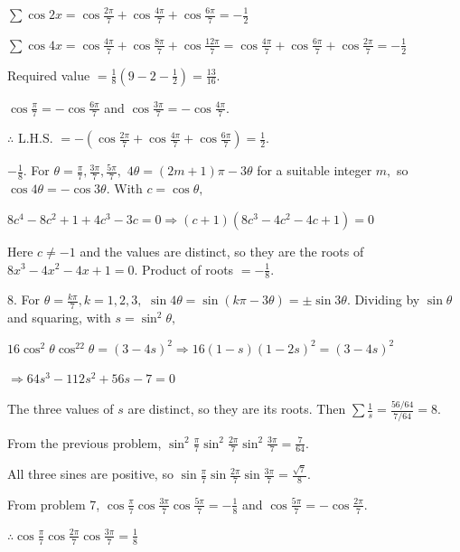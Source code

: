   $\sum\cos2x = \cos\frac{2\pi}{7} + \cos\frac{4\pi}{7} + \cos\frac{6\pi}{7} = -\frac{1}{2}$

  $\sum\cos4x = \cos\frac{4\pi}{7} + \cos\frac{8\pi}{7} + \cos\frac{12\pi}{7} = \cos\frac{4\pi}{7} + \cos\frac{6\pi}{7} +
  \cos\frac{2\pi}{7} = -\frac{1}{2}$

  Required value $= \frac{1}{8}\left(9 - 2 - \frac{1}{2}\right) = \frac{13}{16}$.

\item $\cos\frac{\pi}{7} = -\cos\frac{6\pi}{7}$ and $\cos\frac{3\pi}{7} = -\cos\frac{4\pi}{7}$.

  $\therefore$ L.H.S. $= -\left(\cos\frac{2\pi}{7} + \cos\frac{4\pi}{7} + \cos\frac{6\pi}{7}\right) = \frac{1}{2}$.

\item $-\frac{1}{8}$. For $\theta = \frac{\pi}{7}, \frac{3\pi}{7}, \frac{5\pi}{7},$ $4\theta = (2m + 1)\pi - 3\theta$ for a
  suitable integer $m,$ so $\cos4\theta = -\cos3\theta$. With $c = \cos\theta,$

  $8c^4 - 8c^2 + 1 + 4c^3 - 3c = 0 \Rightarrow (c + 1)(8c^3 - 4c^2 - 4c + 1) = 0$

  Here $c \neq -1$ and the values are distinct, so they are the roots of $8x^3 - 4x^2 - 4x + 1 = 0$. Product of roots $=
  -\frac{1}{8}$.

\item $8$. For $\theta = \frac{k\pi}{7}, k = 1, 2, 3,$ $\sin4\theta = \sin(k\pi - 3\theta) = \pm\sin3\theta$. Dividing by
  $\sin\theta$ and squaring, with $s = \sin^2\theta,$

  $16\cos^2\theta\cos^22\theta = (3 - 4s)^2 \Rightarrow 16(1 - s)(1 - 2s)^2 = (3 - 4s)^2$

  $\Rightarrow 64s^3 - 112s^2 + 56s - 7 = 0$

  The three values of $s$ are distinct, so they are its roots. Then $\sum\frac{1}{s} = \frac{56/64}{7/64} = 8$.

\item From the previous problem, $\sin^2\frac{\pi}{7}\sin^2\frac{2\pi}{7}\sin^2\frac{3\pi}{7} = \frac{7}{64}$.

  All three sines are positive, so $\sin\frac{\pi}{7}\sin\frac{2\pi}{7}\sin\frac{3\pi}{7} = \frac{\sqrt{7}}{8}$.

\item From problem 7, $\cos\frac{\pi}{7}\cos\frac{3\pi}{7}\cos\frac{5\pi}{7} = -\frac{1}{8}$ and $\cos\frac{5\pi}{7} =
  -\cos\frac{2\pi}{7}$.

  $\therefore \cos\frac{\pi}{7}\cos\frac{2\pi}{7}\cos\frac{3\pi}{7} = \frac{1}{8}$


